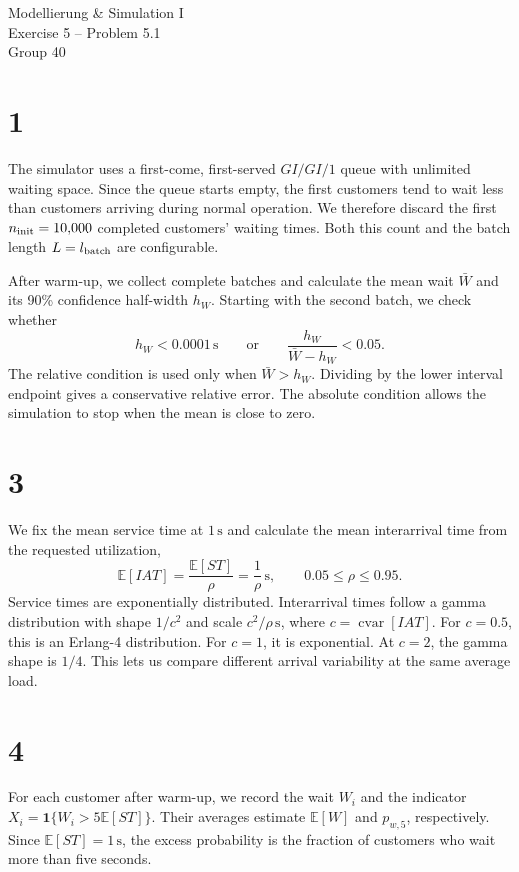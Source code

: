 \documentclass[11pt,a4paper]{article}
\newcommand{\E}{\mathbb{E}}
\newcommand{\unitsec}{\,\mathrm{s}}
\begin{document}
\begin{center}
{\large Modellierung \& Simulation I}\\[2mm]
{\Large Exercise 5 -- Problem 5.1}\\[1mm]
Group 40
\end{center}

\section*{1}

The simulator uses a first-come, first-served \(GI/GI/1\) queue with
unlimited waiting space. Since the queue starts empty, the first customers
tend to wait less than customers arriving during normal operation. We
therefore discard the first \(n_{\rm init}=10{,}000\) completed customers'
waiting times. Both this count and the batch length \(L=l_{\rm batch}\)
are configurable.

After warm-up, we collect complete batches and calculate the mean wait
\(\bar W\) and its 90\% confidence half-width \(h_W\). Starting with the
second batch, we check whether
\[
 h_W<0.0001\unitsec
 \qquad\text{or}\qquad
 \frac{h_W}{\bar W-h_W}<0.05.
\]
The relative condition is used only when \(\bar W>h_W\). Dividing by the
lower interval endpoint gives a conservative relative error. The absolute
condition allows the simulation to stop when the mean is close to zero.

\section*{3}

We fix the mean service time at \(1\unitsec\) and calculate the mean
interarrival time from the requested utilization,
\[
 \E[IAT]=\frac{\E[ST]}{\rho}=\frac{1}{\rho}\unitsec,
 \qquad 0.05\leq\rho\leq0.95.
\]
Service times are exponentially distributed. Interarrival times follow a
gamma distribution with shape \(1/c^2\) and scale \(c^2/\rho\unitsec\),
where \(c=\operatorname{cvar}[IAT]\). For \(c=0.5\), this is an Erlang-4
distribution. For \(c=1\), it is exponential. At \(c=2\), the gamma shape
is \(1/4\). This lets us compare different arrival variability at the
same average load.

\section*{4}

For each customer after warm-up, we record the wait \(W_i\) and the
indicator \(X_i=\mathbf{1}\{W_i>5\E[ST]\}\). Their averages estimate
\(\E[W]\) and \(p_{w,5}\), respectively. Since \(\E[ST]=1\unitsec\),
the excess probability is the fraction of customers who wait more than
five seconds.
\end{document}
